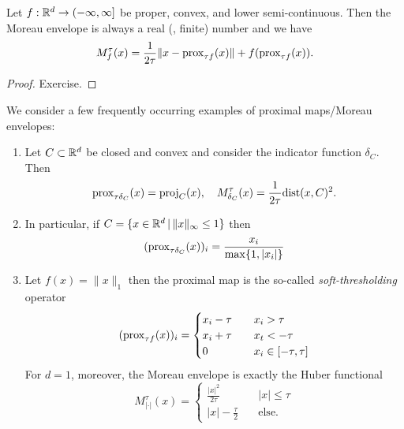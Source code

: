 \begin{lemma}
    Let $f:\mathbb{R}^d\rightarrow (-\infty,\infty]$ be proper, convex, and lower semi-continuous. Then the Moreau envelope is always a real (\ie, finite) number and we have
    \begin{equation}
        M_f^\tau(x) = \frac{1}{2\tau} \|x-\mathrm{prox}_{\tau f}(x)\| + f(\mathrm{prox}_{\tau f}(x)).
    \end{equation}
\end{lemma}
\begin{proof}
    Exercise.
\end{proof}

\begin{example}
    We consider a few frequently occurring examples of proximal maps/Moreau envelopes:
    \begin{enumerate}
        \item Let $C\subset\mathbb{R}^d$ be closed and convex and consider the indicator function $\delta_C$. Then 
        \begin{equation}
            \mathrm{prox}_{\tau \delta_C}(x) = \mathrm{proj}_C(x),\quad M^{\tau}_{\delta_C}(x) = \frac{1}{2\tau}\mathrm{dist}(x,C)^2.
        \end{equation}
        \item In particular, if $C=\{x\in\mathbb{R}^d\,|\, \|x\|_\infty\leq 1\}$ then
        \begin{equation}
            (\mathrm{prox}_{\tau \delta_C}(x))_i = \frac{x_i}{\max\{1,|x_i|\}}
        \end{equation}
        \item Let $f(x) = \|x\|_1$ then the proximal map is the so-called \emph{soft-thresholding} operator
        \begin{equation}
            (\mathrm{prox}_{\tau f}(x))_i = 
            \begin{cases}
                x_i-\tau\quad &x_i>\tau\\
                x_i+\tau\quad &x_t<-\tau\\
                0\quad &x_i\in[-\tau,\tau]
            \end{cases}
        \end{equation}
        For $d=1$, moreover, the Moreau envelope is exactly the Huber functional
        \begin{equation}
            M^\tau_{|\cdot|}(x) = 
            \begin{cases}
                \frac{|x|^2}{2\tau}\quad &|x|\leq \tau\\
                |x|-\frac{\tau}{2} \quad &\text{else.}
            \end{cases}
        \end{equation}
    \end{enumerate}
\end{example}

